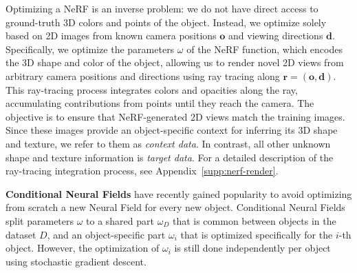 Optimizing a NeRF is an inverse problem: we do not have direct access to ground-truth 3D colors and points of the object. Instead, we optimize solely based on 2D images from known camera positions \( \mathbf{o} \) and viewing directions \( \mathbf{d} \). 
Specifically, we optimize the parameters \( \omega \) of the NeRF function, which encodes the 3D shape and color of the object, allowing us to render novel 2D views from arbitrary camera positions and directions using ray tracing along \( \mathbf{r} = (\mathbf{o}, \mathbf{d}) \). This ray-tracing process integrates colors and opacities along the ray, accumulating contributions from points until they reach the camera.
The objective is to ensure that NeRF-generated 2D views match the training images. Since these images provide an object-specific context for inferring its 3D shape and texture, we refer to them as \emph{context data}. In contrast, all other unknown shape and texture information is \emph{target data}. 
For a detailed description of the ray-tracing integration process, see Appendix~\ref{supp:nerf-render}.


\textbf{Conditional Neural Fields} \cite{papa2023train} have recently gained popularity to avoid optimizing from scratch a new Neural Field for every new object. Conditional Neural Fields split parameters $\omega$ to a shared part $\omega_{D}$ that is common between objects in the dataset $D$, and an object-specific part $\omega_{i}$ that is optimized specifically for the $i$-th object.
However, the optimization of $\omega_{i}$ is still done independently per object using stochastic gradient descent.

